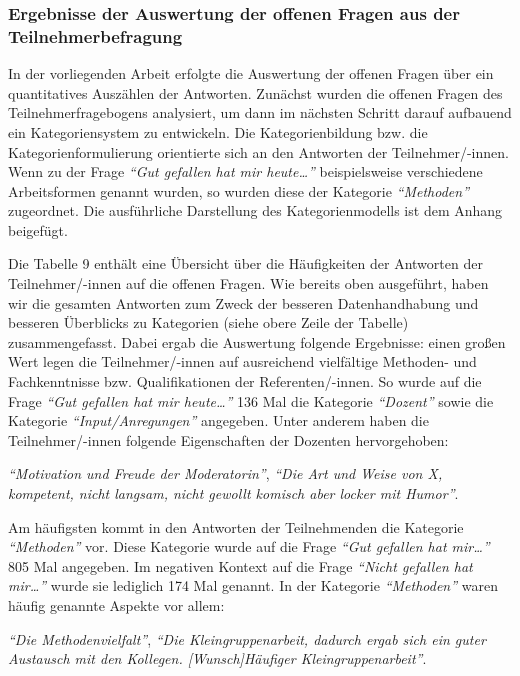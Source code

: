 \documentclass[12pt,a4paper]{article}
\begin{document}
\subsubsection{Ergebnisse der Auswertung der offenen Fragen aus der Teilnehmerbefragung}

In der vorliegenden Arbeit erfolgte die Auswertung der offenen Fragen über ein quantitatives Auszählen der Antworten. Zunächst wurden die offenen Fragen des Teilnehmerfragebogens analysiert, um dann im nächsten Schritt darauf aufbauend ein Kategoriensystem zu entwickeln. Die Kategorienbildung bzw. die Kategorienformulierung orientierte sich an den Antworten der Teilnehmer/-innen. Wenn zu der Frage\textit{ "`Gut gefallen hat mir heute…"'} beispielsweise verschiedene Arbeitsformen  genannt wurden, so wurden diese der Kategorie \textit{"`Methoden"'} zugeordnet. Die ausführliche Darstellung des Kategorienmodells ist dem Anhang beigefügt.

Die Tabelle 9 enthält eine Übersicht über die Häufigkeiten der Antworten der Teilnehmer/-innen auf die offenen Fragen. Wie bereits oben ausgeführt, haben wir die gesamten Antworten zum Zweck der besseren Datenhandhabung und besseren Ü\-ber\-blicks zu Kategorien (siehe obere Zeile der Tabelle) zusammengefasst. Dabei ergab die Auswertung folgende Ergebnisse: einen großen Wert legen die Teil\-neh\-mer/-in\-nen auf ausreichend vielfältige Methoden- und Fachkenntnisse bzw. Qualifikationen der Referenten/-innen. So wurde auf die Frage\textit{ "`Gut gefallen hat mir heute…"'} 136 Mal die Kategorie \textit{"`Dozent"'} sowie die Kategorie \textit{"`Input/Anregungen"'} angegeben. Unter anderem haben die Teilnehmer/-innen folgende Eigenschaften der Dozenten hervorgehoben: 

\textit{"`Motivation und Freude der Moderatorin"'},
\textit{"`Die Art und Weise von X, kompetent, nicht langsam, nicht gewollt komisch aber locker mit Humor"'}.

	Am häufigsten kommt in den Antworten der Teilnehmenden die Kategorie \textit{"`Methoden"'} vor. Diese Kategorie wurde auf die Frage \textit{"`Gut gefallen hat mir…"'} 805 Mal angegeben. Im negativen Kontext auf die Frage \textit{"`Nicht gefallen hat mir…"'} wurde sie lediglich 174 Mal genannt. In der Kategorie \textit{"`Methoden"'} waren häufig genannte Aspekte vor allem: 
	
\textit{ "`Die Methodenvielfalt"'},
\textit{"`Die Kleingruppenarbeit, dadurch ergab sich ein guter Austausch mit den Kollegen. [Wunsch]Häufiger Kleingruppenarbeit"'}.
\end{document}
